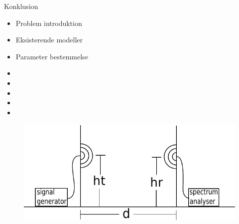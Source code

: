 \begin{frame}{Konklusion}
	\begin{minipage}{0.5\textwidth}
		\begin{itemize}
		\item Problem introduktion
		\item Eksisterende modeller
		\item Parameter bestemmelse
		\item[] 
		\item[] 
		\item[] 
		\item[] 
		\item[] 
		\end{itemize}
	\end{minipage}%
	\begin{minipage}{0.5\textwidth}
		\begin{figure}[H]
			\centering
			\includegraphics[width=\columnwidth]{figures/setup.pdf}
		\end{figure}
	\end{minipage}%
\end{frame}

